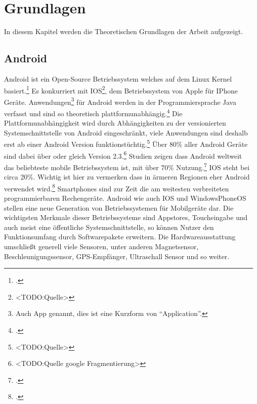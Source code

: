\section{Grundlagen}
	In diesem Kapitel werden die Theoretischen Grundlagen der Arbeit aufgezeigt.
\subsection{Android}
	Android ist ein Open-Source Betriebssystem welches auf dem Linux Kernel basiert.\footcite{android} Es konkurriert mit IOS\footnote{<TODO:Quelle>}, dem Betriebssystem von Apple für IPhone Geräte. Anwendungen\footnote{Auch App genannt, dies ist eine Kurzform von \enquote{Application}.} für Android werden in der Programmiersprache Java verfasst und sind so theoretisch plattformunabhängig.\footcite{java} Die Plattformunabhängigkeit wird durch Abhängigkeiten zu der versionierten Systemschnittstelle von Android eingeschränkt, viele Anwendungen sind deshalb erst ab einer Android Version funktionstüchtig.\footnote{<TODO:Quelle>} Über 80\% aller Android Geräte sind dabei über oder gleich Version 2.3.\footnote{<TODO:Quelle google Fragmentierung>}
	Studien zeigen dass Android weltweit das beliebteste mobile Betriebssystem ist, mit über 70\% Nutzung.\footcite[\url{http://gs.statcounter.com/\#mobile_os-ww-monthly-200812-201701}]{android-stats} IOS steht bei circa 20\%. Wichtig ist hier zu vermerken dass in ärmeren Regionen eher Android verwendet wird.\footcite[\url{http://gs.statcounter.com/\#mobile_os-ww-monthly-201701-201701-map}]{android-stats} Smartphones sind zur Zeit die am weitesten verbreiteten programmierbaren Rechengeräte.
	Android wie auch IOS und WindowsPhoneOS stellen eine neue Generation von Betriebssystemen für Mobilgeräte dar. Die wichtigsten Merkmale dieser Betriebssysteme sind Appstores, Toucheingabe und auch meist eine öffentliche Systemschnittstelle, so können Nutzer den Funktionsumfang durch Softwarepakete erweitern.
	Die Hardwareausstattung umschließt generell viele Sensoren, unter anderen Magnetsensor, Beschleunigungssensor, GPS-Empfänger, Ultraschall Sensor und so weiter.
